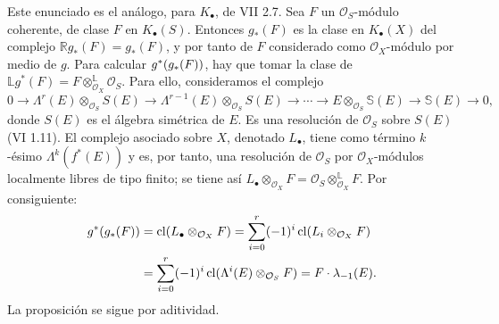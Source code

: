Este enunciado es el análogo, para $K_\bullet$, de VII 2.7. Sea $F$ un $\mathcal O_S$-módulo coherente, de clase $F$ en $K_\bullet(S)$. Entonces $g_*(F)$ es la clase en $K_\bullet(X)$ del complejo $\mathbb Rg_*(F)=g_*(F)$, y por tanto de $F$ considerado como $\mathcal O_X$-módulo por medio de $g$. Para calcular $g^*(g_*(\sisi{f}{F}))$, hay que tomar la clase de \(\mathbb Lg^*(F)=F\otimes^{\mathbb L}_{\mathcal O_X}\mathcal O_S\).
Para ello, consideramos el complejo
\[
0\longrightarrow \Lambda^r(E)\otimes_{\mathcal O_S}S(E)\longrightarrow
\Lambda^{r-1}(E)\otimes_{\mathcal O_S}S(E)\longrightarrow\cdots\longrightarrow
E\otimes_{\mathcal O_S}\mathbb S(E)\longrightarrow \mathbb S(E)\longrightarrow 0,
\]
donde $S(E)$ es el álgebra simétrica de $E$. Es una resolución de $\mathcal O_S$ sobre $S(E)$ (VI 1.11). El complejo asociado sobre $X$, denotado $L_\bullet$, tiene como término $k$-ésimo $\Lambda^k(f^*(E))$ y es, por tanto, una resolución de $\mathcal O_S$ por $\mathcal O_X$-módulos localmente libres de tipo finito; se tiene así \(L_\bullet\otimes_{\mathcal O_X}F=\mathcal O_S\otimes^{\mathbb L}_{\mathcal O_X}F\). Por consiguiente:
\[
\begin{aligned}
g^*(g_*(F))
&=\cl(L_\bullet\otimes_{\mathcal O_X}F)
=\sum_{i=0}^r(-1)^i\cl(L_i\otimes_{\mathcal O_X}F)\\
&=\sum_{i=0}^r(-1)^i\cl(\Lambda^i(E)\otimes_{\mathcal O_S}F)
=F\cdot\lambda_{-1}(E).
\end{aligned}
\]
La proposición se sigue por aditividad.


